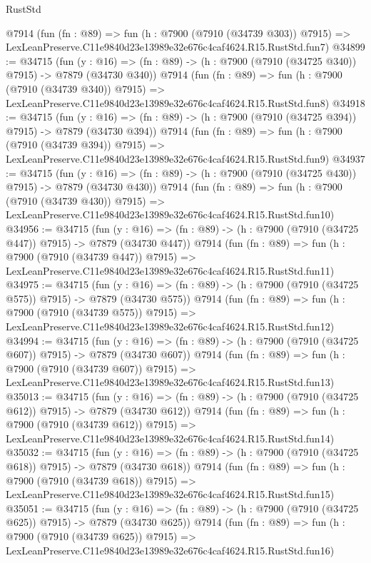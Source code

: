 \begin{lexlean}{RustStd}
\begin{coremodule}
    @7914
    (fun (fn : @89) =>
    fun (h : @7900 (@7910 (@34739 @303)) @7915) =>
    LexLeanPreserve.C11e9840d23e13989e32e676c4caf4624.R15.RustStd.fun7)
@34899 := @34715
    (fun (y : @16) => (fn : @89) -> (h : @7900 (@7910 (@34725 @340)) @7915) -> @7879 (@34730 @340))
    @7914
    (fun (fn : @89) =>
    fun (h : @7900 (@7910 (@34739 @340)) @7915) =>
    LexLeanPreserve.C11e9840d23e13989e32e676c4caf4624.R15.RustStd.fun8)
@34918 := @34715
    (fun (y : @16) => (fn : @89) -> (h : @7900 (@7910 (@34725 @394)) @7915) -> @7879 (@34730 @394))
    @7914
    (fun (fn : @89) =>
    fun (h : @7900 (@7910 (@34739 @394)) @7915) =>
    LexLeanPreserve.C11e9840d23e13989e32e676c4caf4624.R15.RustStd.fun9)
@34937 := @34715
    (fun (y : @16) => (fn : @89) -> (h : @7900 (@7910 (@34725 @430)) @7915) -> @7879 (@34730 @430))
    @7914
    (fun (fn : @89) =>
    fun (h : @7900 (@7910 (@34739 @430)) @7915) =>
    LexLeanPreserve.C11e9840d23e13989e32e676c4caf4624.R15.RustStd.fun10)
@34956 := @34715
    (fun (y : @16) => (fn : @89) -> (h : @7900 (@7910 (@34725 @447)) @7915) -> @7879 (@34730 @447))
    @7914
    (fun (fn : @89) =>
    fun (h : @7900 (@7910 (@34739 @447)) @7915) =>
    LexLeanPreserve.C11e9840d23e13989e32e676c4caf4624.R15.RustStd.fun11)
@34975 := @34715
    (fun (y : @16) => (fn : @89) -> (h : @7900 (@7910 (@34725 @575)) @7915) -> @7879 (@34730 @575))
    @7914
    (fun (fn : @89) =>
    fun (h : @7900 (@7910 (@34739 @575)) @7915) =>
    LexLeanPreserve.C11e9840d23e13989e32e676c4caf4624.R15.RustStd.fun12)
@34994 := @34715
    (fun (y : @16) => (fn : @89) -> (h : @7900 (@7910 (@34725 @607)) @7915) -> @7879 (@34730 @607))
    @7914
    (fun (fn : @89) =>
    fun (h : @7900 (@7910 (@34739 @607)) @7915) =>
    LexLeanPreserve.C11e9840d23e13989e32e676c4caf4624.R15.RustStd.fun13)
@35013 := @34715
    (fun (y : @16) => (fn : @89) -> (h : @7900 (@7910 (@34725 @612)) @7915) -> @7879 (@34730 @612))
    @7914
    (fun (fn : @89) =>
    fun (h : @7900 (@7910 (@34739 @612)) @7915) =>
    LexLeanPreserve.C11e9840d23e13989e32e676c4caf4624.R15.RustStd.fun14)
@35032 := @34715
    (fun (y : @16) => (fn : @89) -> (h : @7900 (@7910 (@34725 @618)) @7915) -> @7879 (@34730 @618))
    @7914
    (fun (fn : @89) =>
    fun (h : @7900 (@7910 (@34739 @618)) @7915) =>
    LexLeanPreserve.C11e9840d23e13989e32e676c4caf4624.R15.RustStd.fun15)
@35051 := @34715
    (fun (y : @16) => (fn : @89) -> (h : @7900 (@7910 (@34725 @625)) @7915) -> @7879 (@34730 @625))
    @7914
    (fun (fn : @89) =>
    fun (h : @7900 (@7910 (@34739 @625)) @7915) =>
    LexLeanPreserve.C11e9840d23e13989e32e676c4caf4624.R15.RustStd.fun16)

\end{coremodule}
\end{lexlean}
